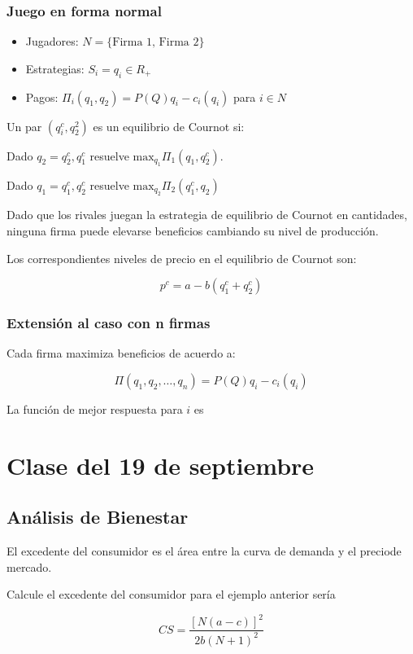 \documentclass[letterpaper,12pt,twocolumn]{report}
\begin{document}
\subsubsection*{Juego en forma normal}

\begin{itemize}
	\item Jugadores: $N= \{\text{Firma 1, Firma 2}\}$
	\item Estrategias: $S_i=q_i \in R_+$
	\item Pagos: $\Pi_i(q_1,q_2)= P(Q)q_i-c_i(q_i)$ para $i \in N$
\end{itemize}

Un par $(q_i^c,q_2^2)$ es un equilibrio de Cournot si:

Dado $q_2= q_2^c, q_1^c$ resuelve $\text{max}_{q_{1}} \Pi_1(q_1,q_2^c)$.

Dado $q_1=q_1^c,q_2^c$ resuelve $\text{max}_{q_{2}}\Pi_2(q_1^c,q_2)$

Dado que los rivales juegan la estrategia de equilibrio de Cournot en cantidades, ninguna firma puede elevarse beneficios cambiando su nivel de producción.

Los correspondientes niveles de precio en el equilibrio de Cournot son:

$$ p^c=a-b(q_1^c+q_2^c) $$

\subsubsection*{Extensión al caso con n firmas}

Cada firma maximiza beneficios de acuerdo a: 

$$ \Pi(q_1,q_2,\dots,q_n)= P(Q)q_i-c_i(q_i) $$

La función de mejor respuesta para $i$ es 

\section{Clase del 19 de septiembre}

\subsection*{Análisis de Bienestar}


El excedente del consumidor es el área entre la curva de demanda y el preciode mercado.

Calcule el excedente del consumidor para el ejemplo anterior sería 

$$ CS= \frac{[N(a-c)]^2}{2b(N+1)^2} $$
\end{document}
